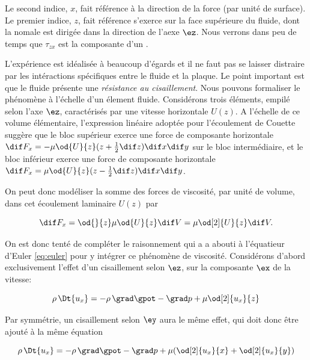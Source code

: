 Le second indice, $x$, fait référence à la direction de la force (par unité de surface). Le premier indice,  $z$, fait référence s'exerce sur la face supérieure du fluide, dont la nomale est dirigée dans la direction de l'aexe $\ez$. Nous verrons dans peu de temps que $\tau_{zx}$ est la composante d'un . 


L'expérience est idéalisée à beaucoup d'égards et il ne faut pas se laisser distraire par les intéractions spécifiques entre le fluide et la plaque. Le point important est que le fluide présente une \emph{résistance au cisaillement}. Nous pouvons formaliser le phénomène à l'échelle d'un élement fluide. Considérons trois éléments, empilé selon l'axe $\ez$, caractérisés par une vitesse horizontale $U(z)$. A l'échelle de ce volume élémentaire, l'expression linéaire adoptée pour l'écoulement de Couette suggère que le bloc supérieur exerce une force de composante horizontale  $\dif F_x = -\mu \od{U}{z}(z+\frac{1}{2}\dif z)\dif x\dif y$ sur le bloc intermédiaire, et le bloc inférieur exerce une force de composante horizontale $\dif F_x = \mu \od{U}{z}(z-\frac{1}{2}\dif z)\dif x\dif y$. 

On peut donc modéliser la somme des forces de viscosité, par unité de volume, dans cet écoulement laminaire $U(z)$ par 

\begin{equation}
  \dif F_x = \od{}{z} \mu \od{U}{z} \dif V =  \mu \od[2]{U}{z} \dif V. 
  \label{eq:newtonnien}
\end{equation}

On est donc tenté de compléter le raisonnement qui a a abouti à l'équatieur d'Euler \eqref{eq:euler} pour y intégrer ce phénomène de viscosité. Considérons d'abord exclusivement l'effet d'un cisaillement selon $\ez$, sur la composante $\ex$ de la vitesse:

\begin{displaymath}
  \rho \, \Dt{u_x} = - \rho \, \grad \gpot - \grad p + \mu \od[2]{u_x}{z} 
\end{displaymath}

Par symmétrie, un cisaillement selon $\ey$ aura le même effet, qui doit donc être ajouté à la même équation

\begin{displaymath}
  \rho \, \Dt{u_x} = - \rho \, \grad \gpot - \grad p + \mu ( \od[2]{u_x}{x} + \od[2]{u_x}{y} )
\end{displaymath}

